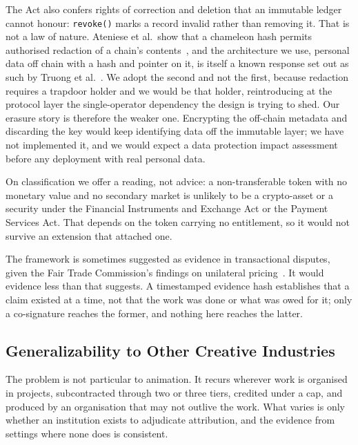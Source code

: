 The Act also confers rights of correction and deletion that an immutable ledger cannot
honour: \texttt{revoke()} marks a record invalid rather than removing it. That is not a
law of nature. Ateniese et al.\ show that a chameleon hash permits authorised redaction
of a chain's contents~\cite{ateniese2017redactable}, and the architecture we use, personal
data off chain with a hash and pointer on it, is itself a known response set out as such
by Truong et al.~\cite{truong2020gdpr}. We adopt the second and not the first, because
redaction requires a trapdoor holder and we would be that holder, reintroducing at the
protocol layer the single-operator dependency the design is trying to shed. Our erasure
story is therefore the weaker one. Encrypting the off-chain metadata and discarding the
key would keep identifying data off the immutable layer; we have not implemented it, and
we would expect a data protection impact assessment before any deployment with real
personal data.

On classification we offer a reading, not advice: a non-transferable token with no
monetary value and no secondary market is unlikely to be a crypto-asset or a security
under the Financial Instruments and Exchange Act or the Payment Services Act. That
depends on the token carrying no entitlement, so it would not survive an extension that
attached one.

The framework is sometimes suggested as evidence in transactional disputes, given the
Fair Trade Commission's findings on unilateral pricing~\cite{jftc2025anime}. It would
evidence less than that suggests. A timestamped evidence hash establishes that a claim
existed at a time, not that the work was done or what was owed for it; only a
co-signature reaches the former, and nothing here reaches the latter.

\subsection{Generalizability to Other Creative Industries}
\label{subsec:generalizability}

The problem is not particular to animation. It recurs wherever work is organised in
projects, subcontracted through two or three tiers, credited under a cap, and produced by
an organisation that may not outlive the work. What varies is only whether an institution
exists to adjudicate attribution, and the evidence from settings where none does is
consistent.

